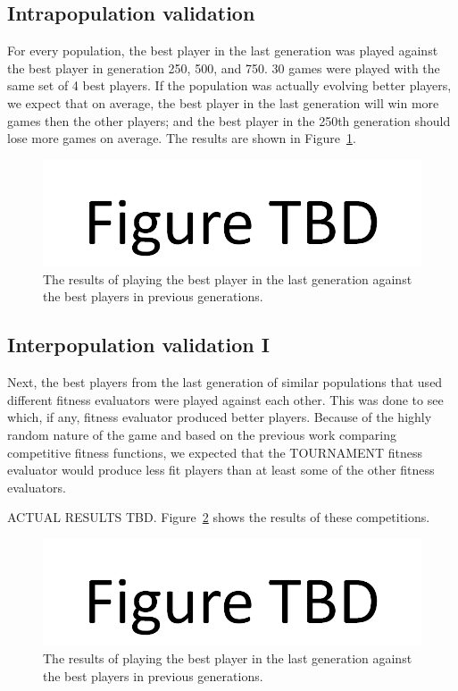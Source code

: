\subsection{Intrapopulation validation}

For every population, the best player in the last generation was played against
the best player in generation 250, 500, and 750. 30 games were played with the
same set of 4 best players. If the population was actually evolving better
players, we expect that on average, the best player in the last generation will
win more games then the other players; and the best player in the 250th
generation should lose more games on average. The results are shown in
Figure~\ref{figure-intrapopulation}.

\begin{figure}[htp]
\centerline{\includegraphics[width=0.75\columnwidth]{Figures/figureTBD.png}}
\caption[Intrapopulation validation]{The results of playing the best player in
the last generation against the best players in previous generations.}
\label{figure-intrapopulation}
\end{figure}

\subsection{Interpopulation validation I}

Next, the best players from the last generation of similar populations that used
different fitness evaluators were played against each other. This was done to
see which, if any, fitness evaluator produced better players. Because of the
highly random nature of the game and based on the previous work comparing
competitive fitness functions, we expected that the TOURNAMENT fitness evaluator
would produce less fit players than at least some of the other fitness
evaluators.

ACTUAL RESULTS TBD. Figure~\ref{figure-interpopulation1} shows the results of
these competitions.

\begin{figure}[htp]
\centerline{\includegraphics[width=0.75\columnwidth]{Figures/figureTBD.png}}
\caption[Validation - Comparing Fitness Evaluators]{The results of playing the
best player in the last generation against the best players in previous
generations.}
\label{figure-interpopulation1}
\end{figure}

